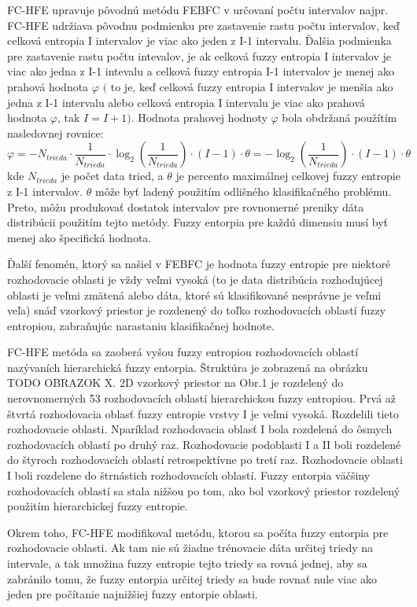 FC-HFE upravuje pôvodnú metódu FEBFC v určovaní počtu intervalov najpr. FC-HFE udržiava pôvodnu podmienku pre zastavenie rastu počtu intervalov, keď celková entropia I intervalov je viac ako jeden z I-1 intervalu. Ďalšia podmienka pre zastavenie rastu počtu intevalov, je ak celková fuzzy entropia I intervalov je viac ako jedna z I-1 intevalu a celková fuzzy entropia I-1 intervalov je menej ako prahová hodnota  $\varphi$ $($ to je, keď celková fuzzy entropia I intervalov je menšia ako jedna z I-1 intervalu alebo celková entropia I intervalu je viac ako prahová hodnota $\varphi$, tak $I=I+1)$. Hodnota prahovej hodnoty $\varphi$ bola obdržaná použítím nasledovnej rovnice:$$\varphi= -N_{trieda}\cdot \frac{1}{N_{trieda}} \cdot \log_2{(\frac{1}{N_{trieda}})}\cdot (I-1) \cdot \theta = - \log_2{(\frac{1}{N_{trieda}})}\cdot(I-1)\cdot\theta$$
kde $N_{trieda}$ je počet data tried, a $\theta$ je percento maximálnej celkovej fuzzy entropie z I-1 intervalov. $\theta$ môže byť ladený použitím odlišného klasifikačného problému. Preto, môžu produkovať dostatok intervalov pre rovnomerné preniky dáta distribúcii použitím tejto metódy. Fuzzy entorpia pre každú dimensiu musí byť menej ako špecifická hodnota. 

Ďalší fenomén, ktorý sa našiel v FEBFC je hodnota fuzzy entropie pre niektoré rozhodovacie oblasti je vždy veľmi vysoká (to je data distribúcia rozhodujúcej oblasti je veľmi zmätená alebo dáta, ktoré sú klasifikované nesprávne je veľmi veľa) snáď vzorkový priestor je rozdenený do toľko rozhodovacích oblastí fuzzy entropiou, zabraňujúc narastaniu klasifikačnej hodnote. 

FC-HFE  metóda sa zaoberá vyšou fuzzy entropiou rozhodovacích oblastí nazývaních hierarchická fuzzy entorpia. Štruktúra je zobrazená na obrázku TODO OBRAZOK X. 2D vzorkový priestor na Obr.1 je rozdelený do nerovnomerných 53 rozhodovacích oblastí hierarchickou fuzzy entropiou. Prvá až štvrtá rozhodovacia oblasť fuzzy entropie vrstvy I je veľmi vysoká. Rozdelili tieto rozhodovacie oblasti. Nparíklad rozhodovacia oblasť I bola rozdelená do ôsmych rozhodovacích oblastí po druhý raz. Rozhodovacie podoblasti I a II boli rozdelené do štyroch rozhodovacích oblastí retrospektívne po tretí raz. Rozhodovacie oblasti I boli rozdelene do štrnástich rozhodovacích oblastí. Fuzzy entorpia väčšiny rozhodovacích oblastí sa stala nižšou po tom, ako bol vzorkový priestor rozdelený použitím hierarchickej fuzzy entropie. 

Okrem toho, FC-HFE modifikoval metódu, ktorou sa počíta fuzzy entorpia pre rozhodovacie oblasti. Ak tam nie sú žiadne trénovacie dáta určitej triedy na intervale, a tak množina fuzzy entropie tejto triedy sa rovná jednej, aby sa zabránilo tomu, že fuzzy entorpia určitej triedy sa bude rovnať nule viac ako jeden pre počítanie najnižšiej fuzzy entorpie oblasti. 

